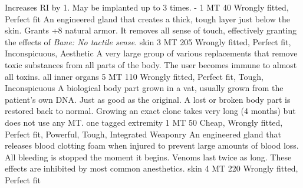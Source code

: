 \begin{multicols}{2}
    {Increases RI by 1.
        May be implanted up to 3 times.}
    {-}
    {1 MT}
    {40}
    {Wrongly fitted, Perfect fit}
    {An engineered gland that creates a thick, tough layer just below the skin.}
    {Grants +8 natural armor.
        It removes all sense of touch,
        effectively granting the effects of \emph{Bane: No tactile sense}.}
    {skin}
    {3 MT}
    {205}
    {Wrongly fitted, Perfect fit, Inconspicuous, Aesthetic}
    {A very large group of various replacements that remove toxic substances from all parts of the body.}
    {The user becomes immune to almost all toxins.}
    {all inner organs}
    {5 MT}
    {110}
    {Wrongly fitted, Perfect fit, Tough, Inconspicuous}
    {A biological body part grown in a vat,
        usually grown from the patient's own DNA.
        Just as good as the original.}
    {A lost or broken body part is restored back to normal.
        Growing an exact clone takes very long (4 months) but does not use any MT.}
    {one tagged extremity}
    {1 MT}
    {50}
    {Cheap, Wrongly fitted, Perfect fit, Powerful, Tough, Integrated Weaponry}
    {An engineered gland that releases blood clotting foam when injured to prevent large amounts of blood loss.}
    {All bleeding is stopped the moment it begins.
        Venoms last twice as long.
        These effects are inhibited by most common anesthetics.}
    {skin}
    {4 MT}
    {220}
    {Wrongly fitted, Perfect fit}
\end{multicols}

